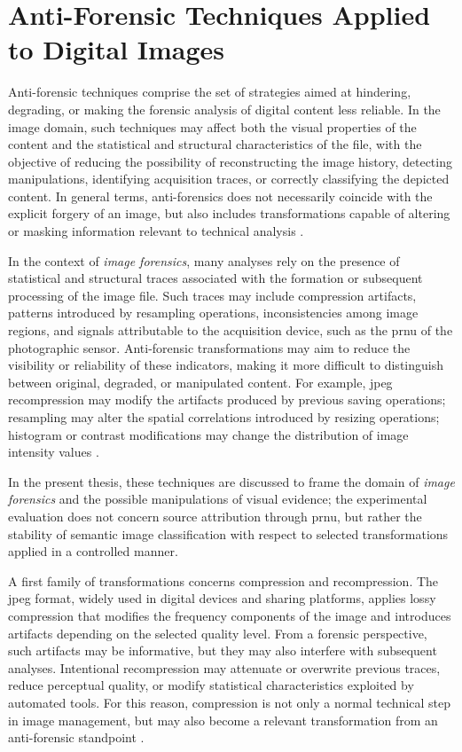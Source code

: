 \section{Anti-Forensic Techniques Applied to Digital Images}
\label{sec:background_antiforensics_images}
Anti-forensic techniques comprise the set of strategies aimed at hindering,
degrading, or making the forensic analysis of digital content less reliable. In
the image domain, such techniques may affect both the visual properties of the
content and the statistical and structural characteristics of the file, with
the objective of reducing the possibility of reconstructing the image history,
detecting manipulations, identifying acquisition traces, or correctly
classifying the depicted content. In general terms, anti-forensics does not
necessarily coincide with the explicit forgery of an image, but also includes
transformations capable of altering or masking information relevant to
technical analysis \cite{stamm2010anti,yaacoub2021digital}.

In the context of \textit{image forensics}, many analyses rely on the presence
of statistical and structural traces associated with the formation or
subsequent processing of the image file. Such traces may include compression
artifacts, patterns introduced by resampling operations, inconsistencies among
image regions, and signals attributable to the acquisition device, such as the
\gls{prnu} of the photographic sensor. Anti-forensic transformations may aim to
reduce the visibility or reliability of these indicators, making it more
difficult to distinguish between original, degraded, or manipulated content.
For example, \gls{jpeg} recompression may modify the artifacts produced by
previous saving operations; resampling may alter the spatial correlations
introduced by resizing operations; histogram or contrast modifications may
change the distribution of image intensity values
\cite{popescu2005exposing,farid2016photo,lukas2006prnu}.

In the present thesis, these techniques are discussed to frame the domain of
\textit{image forensics} and the possible manipulations of visual evidence; the
experimental evaluation does not concern source attribution through
\gls{prnu}, but rather the stability of semantic image classification with
respect to selected transformations applied in a controlled manner.

A first family of transformations concerns compression and recompression. The
\gls{jpeg} format, widely used in digital devices and sharing platforms,
applies lossy compression that modifies the frequency components of the image
and introduces artifacts depending on the selected quality level. From a
forensic perspective, such artifacts may be informative, but they may also
interfere with subsequent analyses. Intentional recompression may attenuate or
overwrite previous traces, reduce perceptual quality, or modify statistical
characteristics exploited by automated tools. For this reason, compression is
not only a normal technical step in image management, but may also become a
relevant transformation from an anti-forensic standpoint
\cite{stamm2010anti,stamm2013information}.

